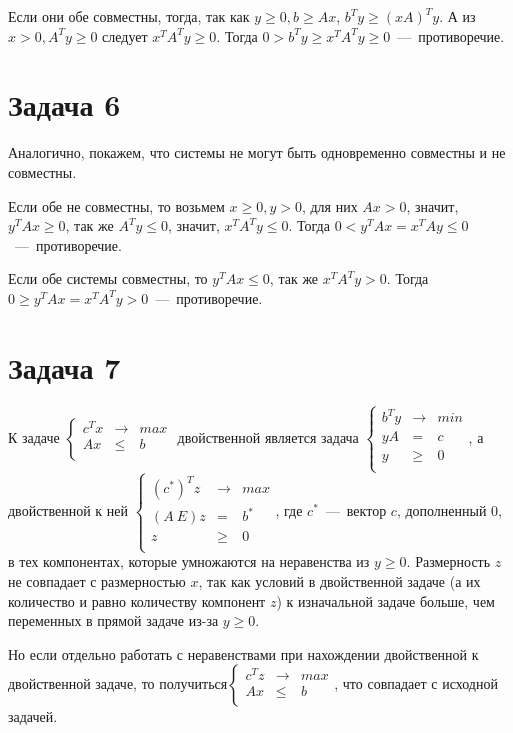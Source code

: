 \documentclass[a4paper,12pt]{article} %
\begin{document}
Если они обе совместны, тогда, так как $y\geq0,b\geq Ax$, $b^Ty\geq (xA)^Ty$. А из $x>0,A^Ty\geq 0$ следует $x^TA^Ty\geq0$. Тогда $0>b^Ty\geq x^TA^Ty\geq 0$~---~противоречие.

\section{Задача 6}
\hspace{5mm}
Аналогично, покажем, что системы не могут быть одновременно совместны и не совместны.

Если обе не совместны, то возьмем $x\geq 0,y>0$, для них $Ax>0$, значит, $y^TAx\geq0$, так же $A^Ty\leq0$, значит, $x^TA^Ty\leq0$. Тогда $0<y^TAx=x^TAy\leq0$~---~противоречие.

Если обе системы совместны, то $y^TAx\leq0$, так же $x^TA^Ty>0$. Тогда $0\geq y^TAx=x^TA^Ty>0$~---~противоречие.	










\section{Задача 7}
\hspace{5mm}
К задаче $\left\{
\begin{array}{ccc}
c^Tx & \rightarrow & max \\
Ax & \leq & b \\
\end{array}\right.$ двойственной является задача $\left\{
\begin{array}{ccc}
b^Ty & \rightarrow & min \\
yA & = & c \\
y & \geq & 0 \\
\end{array}\right.$, а двойственной к ней $\left\{
\begin{array}{ccc}
(c^*)^Tz & \rightarrow & max \\
(A\ E)z & = & b^* \\
z & \geq & 0 \\
\end{array}\right.$, где $c^*$~---~вектор $c$, дополненный $0$, в тех компонентах, которые умножаются на неравенства из $y\geq 0$. Размерность $z$ не совпадает с размерностью $x$, так как условий в двойственной задаче (а их количество и равно количеству компонент $z$) к изначальной задаче больше, чем переменных в прямой задаче из-за $y\geq 0$.

Но если отдельно работать с неравенствами при нахождении двойственной к двойственной задаче, то получиться$\left\{
\begin{array}{ccc}
c^Tz & \rightarrow & max \\
Ax & \leq	 & b \\
\end{array}\right.$, что совпадает с исходной задачей.
\end{document}
